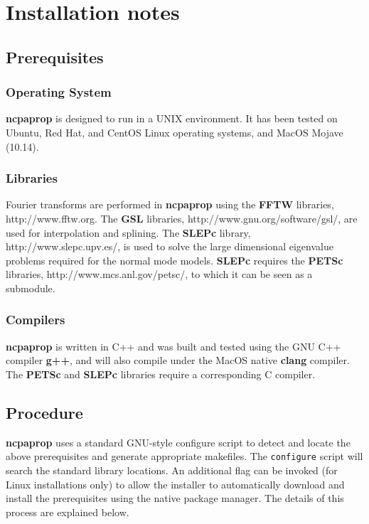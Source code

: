 \section{Installation notes}

\subsection{Prerequisites}

\subsubsection{Operating System}

\textbf{ncpaprop} is designed to run in a UNIX environment. It has been tested on Ubuntu, Red Hat, and CentOS Linux operating systems, and MacOS Mojave (10.14). 

\subsubsection{Libraries}

Fourier transforms are performed in \textbf{ncpaprop} using the \textbf{FFTW} libraries, http://www.fftw.org. The \textbf{GSL} libraries, http://www.gnu.org/software/gsl/, are used for interpolation and splining. The \textbf{SLEPc} library, http://www.slepc.upv.es/, is used to solve the large dimensional eigenvalue problems required for the normal mode models. \textbf{SLEPc} requires the \textbf{PETSc} libraries, http://www.mcs.anl.gov/petsc/, to which it can be seen as a submodule. 

\subsubsection{Compilers}

\textbf{ncpaprop} is written in C++ and was built and tested using the GNU C++ compiler \textbf{g++}, and will also compile under the MacOS native \textbf{clang} compiler.  The \textbf{PETSc} and \textbf{SLEPc} libraries require a corresponding C compiler.

\subsection{Procedure}

\textbf{ncpaprop} uses a standard GNU-style configure script to detect and locate the above prerequisites and generate appropriate makefiles.  The \texttt{configure} script will search the standard library locations. An additional flag can be invoked (for Linux installations only) to allow the installer to automatically download and install the prerequisites using the native package manager. The details of this process are explained below.

